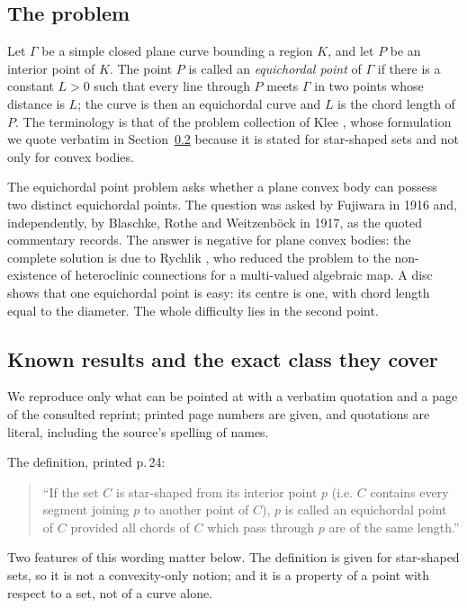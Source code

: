 \documentclass[11pt]{article}
\theoremstyle{definition}
\theoremstyle{remark}
\begin{document}
\subsection{The problem}

Let $\Gamma$ be a simple closed plane curve bounding a region $K$, and let $P$ be an interior point of $K$. The
point $P$ is called an \emph{equichordal point} of $\Gamma$ if there is a constant $L>0$ such that every line
through $P$ meets $\Gamma$ in two points whose distance is $L$; the curve is then an equichordal curve and $L$
is the chord length of $P$. The terminology is that of the problem collection of Klee \cite{klee1960}, whose
formulation we quote verbatim in Section~\ref{sec:intro-lit} because it is stated for star-shaped sets and not
only for convex bodies.

The equichordal point problem asks whether a plane convex body can possess two distinct equichordal points. The
question was asked by Fujiwara in 1916 and, independently, by Blaschke, Rothe and Weitzenb\"ock in 1917, as the
quoted commentary records. The answer is negative for plane convex bodies: the complete solution is due to
Rychlik \cite{rychlik1997}, who reduced the problem to the non-existence of heteroclinic connections for a
multi-valued algebraic map. A disc shows that one equichordal point is easy: its centre is one, with chord
length equal to the diameter. The whole difficulty lies in the second point.

\subsection{Known results and the exact class they cover}\label{sec:intro-lit}

We reproduce only what can be pointed at with a verbatim quotation and a page of the consulted reprint; printed
page numbers are given, and quotations are literal, including the source's spelling of names.

The definition, printed p.\,24:
\begin{quote}
``If the set $C$ is star-shaped from its interior point $p$ (i.e. $C$ contains every segment joining $p$ to
another point of $C$), $p$ is called an equichordal point of $C$ provided all chords of $C$ which pass through
$p$ are of the same length.'' \cite{klee1960}
\end{quote}
Two features of this wording matter below. The definition is given for star-shaped sets, so it is not a
convexity-only notion; and it is a property of a point with respect to a set, not of a curve alone.
\end{document}
